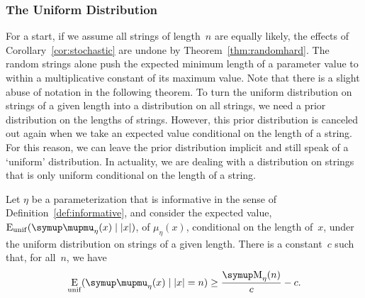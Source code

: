 \subsubsection{The Uniform Distribution}
For a start, if we assume all strings of length~$n$ are equally likely, the effects of Corollary~\ref{cor:stochastic} are undone by Theorem~\ref{thm:randomhard}.
The random strings alone push the expected minimum length of a parameter value to within a multiplicative constant of its maximum value.
Note that there is a slight abuse of notation in the following theorem.
To turn the uniform distribution on strings of a given length into a distribution on all strings, we need a prior distribution on the lengths of strings.
However, this prior distribution is canceled out again when we take an expected value conditional on the length of a string.
For this reason, we can leave the prior distribution implicit and still speak of a `uniform' distribution.
In actuality, we are dealing with a distribution on strings that is only uniform conditional on the length of a string.
\begin{theorem}
\label{thm:expected_uniform}%
  Let $\eta$ be a parameterization that is informative in the sense of Definition~\ref{def:informative}, and consider the expected value, $\Ex_\mathrm{unif}(\mu_\eta(x) \given \length{x})$, of $\mu_\eta(x)$, conditional on the length of~$x$, under the uniform distribution on strings of a given length.
  There is a constant~$c$ such that, for all~$n$, we have
  \begin{equation*}
    \Ex_\mathrm{unif}(\mu_\eta(x) \given \length{x} = n) \ge \frac{\upM_\eta(n)}{c} - c.
  \end{equation*}
\end{theorem}
